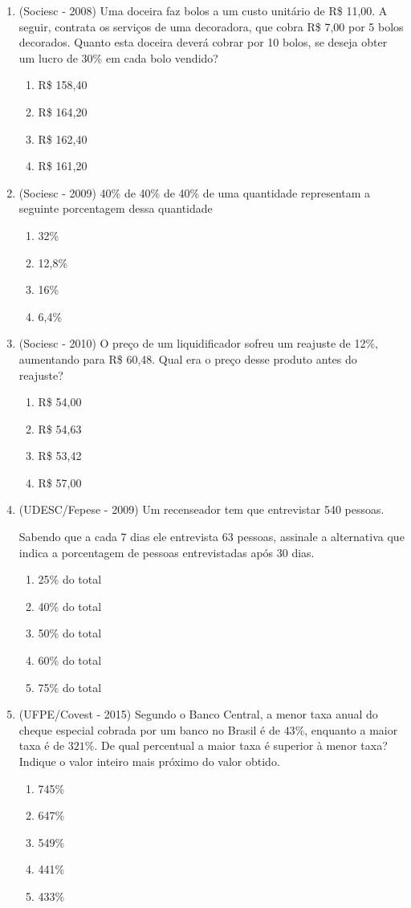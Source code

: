 \begin{enumerate}
 \item (Sociesc - 2008) Uma doceira faz bolos a um custo unitário de R\$ 11,00. A seguir, contrata os serviços de uma decoradora, que cobra R\$ 7,00 por 5 bolos decorados. Quanto esta doceira deverá cobrar por 10 bolos, se deseja obter um lucro de 30\% em cada bolo vendido?
  \begin{enumerate}
  \item R\$ 158,40
  \item R\$ 164,20
  \item R\$ 162,40
  \item R\$ 161,20
 \end{enumerate}
 
 \item (Sociesc - 2009) 40\% de 40\% de 40\% de uma quantidade representam a seguinte porcentagem dessa quantidade
  \begin{enumerate}
  \item 32\%
  \item 12,8\%
  \item 16\%
  \item 6,4\%
 \end{enumerate}
 
 \item (Sociesc - 2010) O preço de um liquidificador sofreu um reajuste de 12\%, aumentando para R\$ 60,48. Qual era o preço desse produto antes do reajuste?
  \begin{enumerate}
  \item R\$ 54,00
  \item R\$ 54,63
  \item R\$ 53,42
  \item R\$ 57,00
 \end{enumerate}
 
 \item (UDESC/Fepese - 2009) Um recenseador tem que entrevistar 540 pessoas.
 
 Sabendo que a cada 7 dias ele entrevista 63 pessoas, assinale a alternativa que indica a porcentagem de pessoas entrevistadas após 30 dias.
  \begin{enumerate}
  \item 25\% do total
  \item 40\% do total
  \item 50\% do total
  \item 60\% do total
  \item 75\% do total
 \end{enumerate}
 
 \item (UFPE/Covest - 2015) Segundo o Banco Central, a menor taxa anual do cheque especial cobrada por um banco no Brasil é de $43\%$, enquanto a maior taxa é de $321\%$. De qual percentual a maior taxa é superior à menor taxa? Indique o valor inteiro mais próximo do valor obtido.
 \begin{enumerate}
 \item 745\%
 \item 647\%
 \item 549\%
 \item 441\%
 \item 433\%
 \end{enumerate}
 

\end{enumerate}
